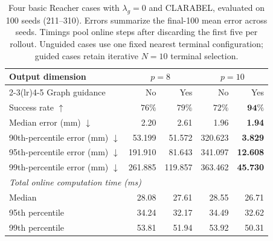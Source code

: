 \begin{table}[htbp]
\centering
\small
\begin{tabular}{lrrrr}
\toprule
Output dimension & \multicolumn{2}{c}{$p=8$} & \multicolumn{2}{c}{$p=10$} \\
\cmidrule(lr){2-3}\cmidrule(lr){4-5}
Graph guidance & No & Yes & No & Yes \\
\midrule
Success rate $\uparrow$ & $76\%$ & $79\%$ & $72\%$ & $\mathbf{94\%}$ \\
Median error (mm) $\downarrow$ & 2.20 & 2.61 & 1.96 & \textbf{1.94} \\
90th-percentile error (mm) $\downarrow$ & 53.199 & 51.572 & 320.623 & \textbf{3.829} \\
95th-percentile error (mm) $\downarrow$ & 191.910 & 81.643 & 341.097 & \textbf{12.608} \\
99th-percentile error (mm) $\downarrow$ & 261.885 & 119.857 & 363.462 & \textbf{45.730} \\
\midrule
\multicolumn{5}{l}{\textit{Total online computation time (ms)}} \\
Median & 28.08 & 27.61 & 28.55 & 26.71 \\
95th percentile & 34.24 & 32.17 & 34.49 & 32.62 \\
99th percentile & 53.81 & 51.94 & 53.92 & 50.31 \\
\bottomrule
\end{tabular}
\caption{Four basic Reacher cases with $\lambda_g=0$ and CLARABEL, evaluated on 100 seeds (211--310). Errors summarize the final-100 mean error across seeds. Timings pool online steps after discarding the first five per rollout. Unguided cases use one fixed nearest terminal configuration; guided cases retain iterative $N=10$ terminal selection.}
\label{tab:basic-cases-clarabel-lamg0}
\end{table}
